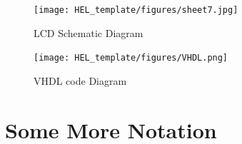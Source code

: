 \documentclass[12pt]{article}
\begin{document}
\begin{appendices}
\begin{figure}[h]
    \centering
    \texttt{[image: HEL\_template/figures/sheet7.jpg]}
    \caption{LCD Schematic Diagram}
    \label{fig:LCD Schematic Diagram}
\end{figure}

\begin{figure}[h]
    \centering
    \texttt{[image: HEL\_template/figures/VHDL.png]}
    \caption{VHDL code Diagram}
    \label{fig:VHDL code Diagram}
\end{figure}

\section{Some More Notation}
\end{appendices}
\end{document}
